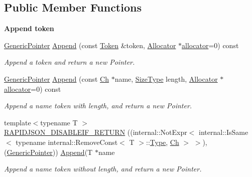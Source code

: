 \subsection*{Public Member Functions}
\begin{Indent}\textbf{ Append token}\par
\begin{DoxyCompactItemize}
\item 
\mbox{\hyperlink{classrapidjson_1_1_generic_pointer}{Generic\+Pointer}} \mbox{\hyperlink{classrapidjson_1_1_generic_pointer_a7cb5eda2af1722e52efa591c4103ebec}{Append}} (const \mbox{\hyperlink{structrapidjson_1_1_generic_pointer_1_1_token}{Token}} \&token, \mbox{\hyperlink{classrapidjson_1_1_allocator}{Allocator}} $\ast$\mbox{\hyperlink{classrapidjson_1_1_generic_pointer_a3e671447cf032271956fa984aad23ef7}{allocator}}=0) const
\begin{DoxyCompactList}\small\item\em Append a token and return a new Pointer. \end{DoxyCompactList}\item 
\mbox{\hyperlink{classrapidjson_1_1_generic_pointer}{Generic\+Pointer}} \mbox{\hyperlink{classrapidjson_1_1_generic_pointer_a30f4eac82e9fded60dead3f7d1cb3941}{Append}} (const \mbox{\hyperlink{classrapidjson_1_1_generic_pointer_a850f78846c5548565f8395be5f3427b7}{Ch}} $\ast$name, \mbox{\hyperlink{namespacerapidjson_a44eb33eaa523e36d466b1ced64b85c84}{Size\+Type}} length, \mbox{\hyperlink{classrapidjson_1_1_allocator}{Allocator}} $\ast$\mbox{\hyperlink{classrapidjson_1_1_generic_pointer_a3e671447cf032271956fa984aad23ef7}{allocator}}=0) const
\begin{DoxyCompactList}\small\item\em Append a name token with length, and return a new Pointer. \end{DoxyCompactList}\item 
{\footnotesize template$<$typename T $>$ }\\\mbox{\hyperlink{classrapidjson_1_1_generic_pointer_aa881255d7b268d819d0f2cc27a4fff81}{R\+A\+P\+I\+D\+J\+S\+O\+N\+\_\+\+D\+I\+S\+A\+B\+L\+E\+I\+F\+\_\+\+R\+E\+T\+U\+RN}} ((internal\+::\+Not\+Expr$<$ internal\+::\+Is\+Same$<$ typename internal\+::\+Remove\+Const$<$ T $>$\+::\mbox{\hyperlink{namespacerapidjson_ae79a4751c1c460ff0de5ecc07874f3e4}{Type}}, \mbox{\hyperlink{classrapidjson_1_1_generic_pointer_a850f78846c5548565f8395be5f3427b7}{Ch}} $>$ $>$),(\mbox{\hyperlink{classrapidjson_1_1_generic_pointer}{Generic\+Pointer}})) \mbox{\hyperlink{classrapidjson_1_1_generic_pointer_a7cb5eda2af1722e52efa591c4103ebec}{Append}}(T $\ast$name
\begin{DoxyCompactList}\small\item\em Append a name token without length, and return a new Pointer. \end{DoxyCompactList}\end{DoxyCompactItemize}
\end{Indent}
